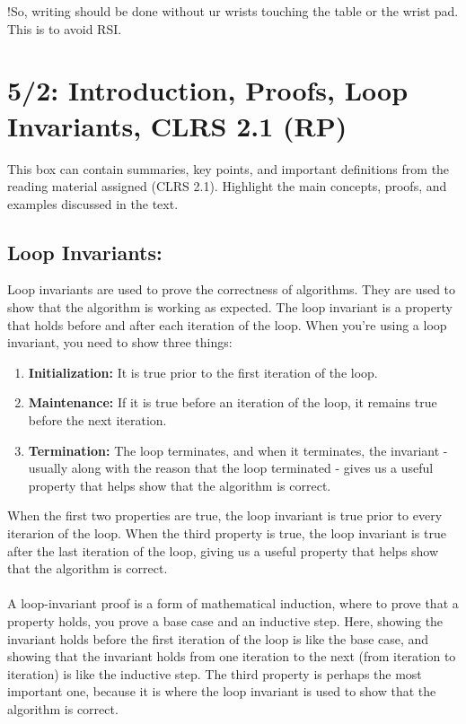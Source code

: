 
!So, writing should be done without ur wrists touching the table or the wrist pad. This is to avoid RSI.\\

\section{5/2: Introduction, Proofs, Loop Invariants, CLRS 2.1 (RP)}

\begin{tcolorbox}[title=Chapter Quick Summary Notes (CRLS 2.1)]
  This box can contain summaries, key points, and important definitions from the reading material assigned (CLRS 2.1). Highlight the main concepts, proofs, and examples discussed in the text.
\end{tcolorbox}

\subsection{Loop Invariants:}
Loop invariants are used to prove the correctness of algorithms. They are used to show that the algorithm is working as expected. The loop invariant is a property that holds before and after each iteration of the loop. When you're using a loop invariant, you need to show three things:

\begin{enumerate}
  \item \textbf{Initialization:} It is true prior to the first iteration of the loop.
  \item \textbf{Maintenance:} If it is true before an iteration of the loop, it remains true before the next iteration.
  \item \textbf{Termination:} The loop terminates, and when it terminates, the invariant - usually along with the reason that the loop terminated - gives us a useful property that helps show that the algorithm is correct.
\end{enumerate}
When the first two properties are true, the loop invariant is true prior to every iterarion of the loop. When the third property is true, the loop invariant is true after the last iteration of the loop, giving us a useful property that helps show that the algorithm is correct.
\\ \\
A loop-invariant proof is a form of mathematical induction, where to prove that a property holds, you prove a base case and an inductive step. Here, showing the invariant holds before the first iteration of the loop is like the base case, and showing that the invariant holds from one iteration to the next (from iteration to iteration) is like the inductive step. The third property is perhaps the most important one, because it is where the loop invariant is used to show that the algorithm is correct.




